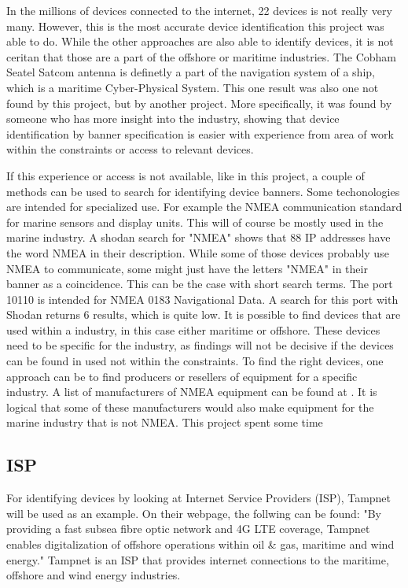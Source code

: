 In the millions of devices connected to the internet, 22 devices is not really very many. However, this is the most accurate device identification this project was able to do. While the other approaches are also able to identify devices, it is not ceritan that those are a part of the offshore or maritime industries. The Cobham Seatel Satcom antenna is definetly a part of the navigation system of a ship, which is a maritime Cyber-Physical System. This one result was also one not found by this project, but by another project. More specifically, it was found by someone who has more insight into the industry, showing that device identification by banner specification is easier with experience from area of work within the constraints or access to relevant devices.

If this experience or access is not available, like in this project, a couple of methods can be used to search for identifying device banners. 
Some techonologies are intended for specialized use. For example the NMEA communication standard for marine sensors and display units. \cite{NMEA} This will of course be mostly used in the marine industry. A shodan search for "NMEA" shows that 88 IP addresses have the word NMEA in their description. While some of those devices probably use NMEA to communicate, some might just have the letters "NMEA" in their banner as a coincidence. This can be the case with short search terms. The port 10110 is intended for NMEA 0183 Navigational Data. \cite{www_ports} A search for this port with Shodan returns 6 results, which is quite low. 
It is possible to find devices that are used within a industry, in this case either maritime or offshore. These devices need to be specific for the industry, as findings will not be decisive if the devices can be found in used not within the constraints. To find the right devices, one approach can be to find producers or resellers of equipment for a specific industry. A list of manufacturers of NMEA equipment can be found at \cite{NMEA}. It is logical that some of these manufacturers would also make equipment for the marine industry that is not NMEA. 
This project spent some time 


\subsection{ISP}
For identifying devices by looking at Internet Service Providers (ISP), Tampnet will be used as an example. On their webpage, the follwing can be found: "By providing a fast subsea fibre optic network and 4G LTE coverage, Tampnet enables digitalization of offshore operations within oil \& gas, maritime and wind energy." \cite{tampnet} Tampnet is an ISP that provides internet connections to the maritime, offshore and wind energy industries. 

